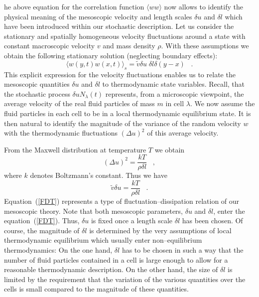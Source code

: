 he above equation for the correlation function $\langle ww \rangle$
now allows to identify the physical meaning of the mesoscopic velocity
and length scales $\delta u$ and $\delta l$ which have been introduced
within our stochastic description. Let us consider the stationary and
spatially homogeneous
velocity fluctuations around a state with constant macroscopic
velocity $v$ and mass density $\rho$.
With these assumptions we obtain  the following stationary
solution (neglecting boundary effects):
\begin{equation}     \label{corrstat}
\langle w(y,t) w(x,t) \rangle_{s} = {\tilde{v}} \delta u \; \delta l \delta (y-x)
\;\;\; . 
\end{equation}
This explicit expression for the velocity
fluctuations enables us to relate the mesoscopic quantities $\delta u$ and
$\delta l$ to thermodynamic state variables. Recall, that the stochastic
process $\delta u N_{\lambda}(t)$ represents, from a microscopic viewpoint,
the average velocity of the real fluid particles of mass $m$ in cell $\lambda$.
We now assume the fluid particles in each cell to be in a local
thermodynamic equilibrium state.
It is then natural to identify the magnitude of the variance of the
random velocity $w$ with the thermodynamic fluctuations $(\Delta u)^2$ of this
average velocity.

From the Maxwell distribution at temperature $T$ we obtain
\begin{equation}
(\Delta u)^{2} = \frac{kT}{\rho \delta l} \;\;\; ,  \label{KT}
\end{equation}
where $k$ denotes Boltzmann's constant. Thus we have
\begin{equation}
\tilde{v} \delta u = \frac{kT}{\rho \delta l}  \;\;\; . \label{FDT}
\end{equation}
Equation~(\ref{FDT}) represents a type of fluctuation--dissipation relation
of our mesoscopic theory.
Note that both mesoscopic parameters, $\delta u$ and $\delta l$, enter
the equation~(\ref{FDT}). Thus, $\delta u$ is fixed once a length scale
$\delta l$ has been chosen. Of course, the magnitude of $\delta l$ is
determined by the very assumptions of local thermodynamic equilibrium which
usually enter non--equilibrium thermodynamics: On the one hand, $\delta l$
has to be chosen in such a way that the number  of fluid particles
contained in a cell is large enough to allow for a reasonable thermodynamic
description. On the other hand, the size of $\delta l$ is limited by the
requirement that the variation of the various quantities over the
cells is small compared to the magnitude of these quantities.

